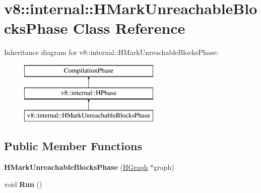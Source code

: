 \hypertarget{classv8_1_1internal_1_1_h_mark_unreachable_blocks_phase}{}\section{v8\+:\+:internal\+:\+:H\+Mark\+Unreachable\+Blocks\+Phase Class Reference}
\label{classv8_1_1internal_1_1_h_mark_unreachable_blocks_phase}
Inheritance diagram for v8\+:\+:internal\+:\+:H\+Mark\+Unreachable\+Blocks\+Phase\+:\begin{figure}[H]
\begin{center}
\leavevmode
\includegraphics[height=3.000000cm]{classv8_1_1internal_1_1_h_mark_unreachable_blocks_phase}
\end{center}
\end{figure}
\subsection*{Public Member Functions}
\begin{DoxyCompactItemize}
\item 
{\bfseries H\+Mark\+Unreachable\+Blocks\+Phase} (\hyperlink{classv8_1_1internal_1_1_h_graph}{H\+Graph} $\ast$graph)\hypertarget{classv8_1_1internal_1_1_h_mark_unreachable_blocks_phase_a30a9df49e5dba6a7e215dd7a70204ee5}{}\label{classv8_1_1internal_1_1_h_mark_unreachable_blocks_phase_a30a9df49e5dba6a7e215dd7a70204ee5}

\item 
void {\bfseries Run} ()\hypertarget{classv8_1_1internal_1_1_h_mark_unreachable_blocks_phase_a4a32ce0344eda26d366967cf30c1ed58}{}\label{classv8_1_1internal_1_1_h_mark_unreachable_blocks_phase_a4a32ce0344eda26d366967cf30c1ed58}

\end{DoxyCompactItemize}
